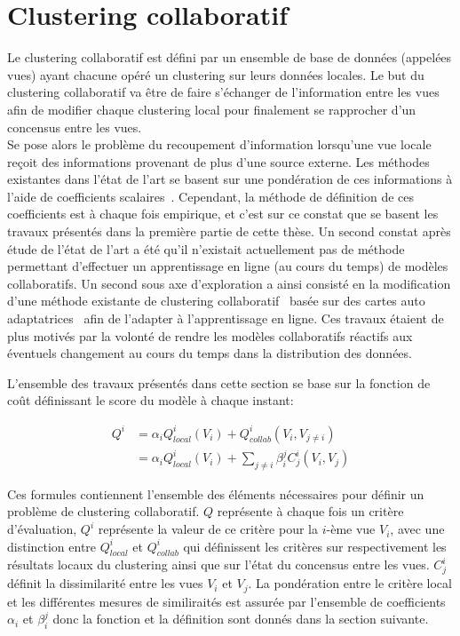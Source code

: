 \documentclass[a4paper]{article}
\begin{document}
\section{Clustering collaboratif}


Le clustering collaboratif est défini par un ensemble de base de données (appelées vues) ayant chacune opéré un clustering sur leurs données locales. Le but du clustering collaboratif va être de faire s'échanger de l'information entre les vues afin de modifier chaque clustering local pour finalement se rapprocher d'un concensus entre les vues.\\

Se pose alors le problème du recoupement d'information lorsqu'une vue locale reçoit des informations provenant de plus d'une source externe. Les méthodes existantes dans l'état de l'art se basent sur une pondération de ces informations à l'aide de coefficients scalaires~\cite{cornuejols2018collaborative,pedrycz2002collaborative,maurel2017incremental,ghassany2012collaborative,sublime2016collaborative,rastin2015collaborative}. Cependant, la méthode de définition de ces coefficients est à chaque fois empirique, et c'est sur ce constat que se basent les travaux présentés dans la première partie de cette thèse. Un second constat après étude de l'état de l'art a été qu'il n'existait actuellement pas de méthode permettant d'effectuer un apprentissage en ligne (au cours du temps) de modèles collaboratifs. Un second sous axe d'exploration a ainsi consisté en la modification d'une méthode existante de clustering collaboratif~\cite{ghassany2012collaborative} basée sur des cartes auto adaptatrices~\cite{KOHO1} afin de l'adapter à l'apprentissage en ligne. Ces travaux étaient de plus motivés par la volonté de rendre les modèles collaboratifs réactifs aux éventuels changement au cours du temps dans la distribution des données.

L'ensemble des travaux présentés dans cette section se base sur la fonction de co\^{u}t définissant le score du modèle à chaque instant:

\begin{align}
    \label{eq:sum_globalC}
    Q^i &= \alpha_i Q^i_{local}(V_i) + Q^i_{collab}(V_i, V_{j\neq i})\\
    &= \alpha_i Q^i_{local}(V_i) + \sum_{j\neq i} \beta_i^j C_j^i(V_i, V_j)
\end{align}

Ces formules contiennent l'ensemble des éléments nécessaires pour définir un problème de clustering collaboratif. $Q$ représente à chaque fois un critère d'évaluation, $Q^i$ représente la valeur de ce critère pour la $i$-ème vue $V_i$, avec une distinction entre $Q^i_{local}$ et $Q^i_{collab}$ qui définissent les critères sur respectivement les résultats locaux du clustering ainsi que sur l'état du concensus entre les vues. $C_j^i$ définit la dissimilarité entre les vues $V_i$ et $V_j$. La pondération entre le critère local et les différentes mesures de similiraités est assurée par l'ensemble de coefficients $\alpha_i$ et $\beta^j_i$ donc la fonction et la définition sont donnés dans la section suivante.
\end{document}
